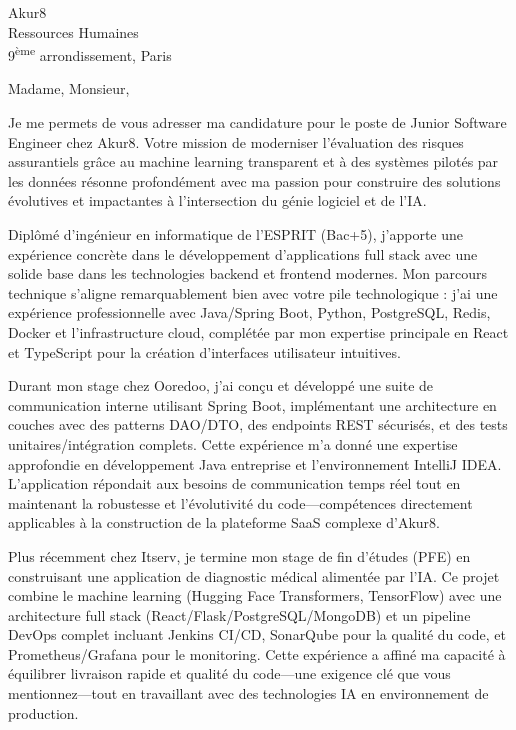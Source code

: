 \documentclass[11pt,a4paper]{letter}
\begin{document}
\begin{letter}{
    Akur8 \\
    Ressources Humaines \\
    9\textsuperscript{ème} arrondissement, Paris
}

\opening{Madame, Monsieur,}

Je me permets de vous adresser ma candidature pour le poste de Junior Software Engineer chez Akur8. Votre mission de moderniser l'évaluation des risques assurantiels grâce au machine learning transparent et à des systèmes pilotés par les données résonne profondément avec ma passion pour construire des solutions évolutives et impactantes à l'intersection du génie logiciel et de l'IA.

Diplômé d'ingénieur en informatique de l'ESPRIT (Bac+5), j'apporte une expérience concrète dans le développement d'applications full stack avec une solide base dans les technologies backend et frontend modernes. Mon parcours technique s'aligne remarquablement bien avec votre pile technologique : j'ai une expérience professionnelle avec Java/Spring Boot, Python, PostgreSQL, Redis, Docker et l'infrastructure cloud, complétée par mon expertise principale en React et TypeScript pour la création d'interfaces utilisateur intuitives.

Durant mon stage chez Ooredoo, j'ai conçu et développé une suite de communication interne utilisant Spring Boot, implémentant une architecture en couches avec des patterns DAO/DTO, des endpoints REST sécurisés, et des tests unitaires/intégration complets. Cette expérience m'a donné une expertise approfondie en développement Java entreprise et l'environnement IntelliJ IDEA. L'application répondait aux besoins de communication temps réel tout en maintenant la robustesse et l'évolutivité du code---compétences directement applicables à la construction de la plateforme SaaS complexe d'Akur8.

Plus récemment chez Itserv, je termine mon stage de fin d'études (PFE) en construisant une application de diagnostic médical alimentée par l'IA. Ce projet combine le machine learning (Hugging Face Transformers, TensorFlow) avec une architecture full stack (React/Flask/PostgreSQL/MongoDB) et un pipeline DevOps complet incluant Jenkins CI/CD, SonarQube pour la qualité du code, et Prometheus/Grafana pour le monitoring. Cette expérience a affiné ma capacité à équilibrer livraison rapide et qualité du code---une exigence clé que vous mentionnez---tout en travaillant avec des technologies IA en environnement de production.


\end{letter}
\end{document}
